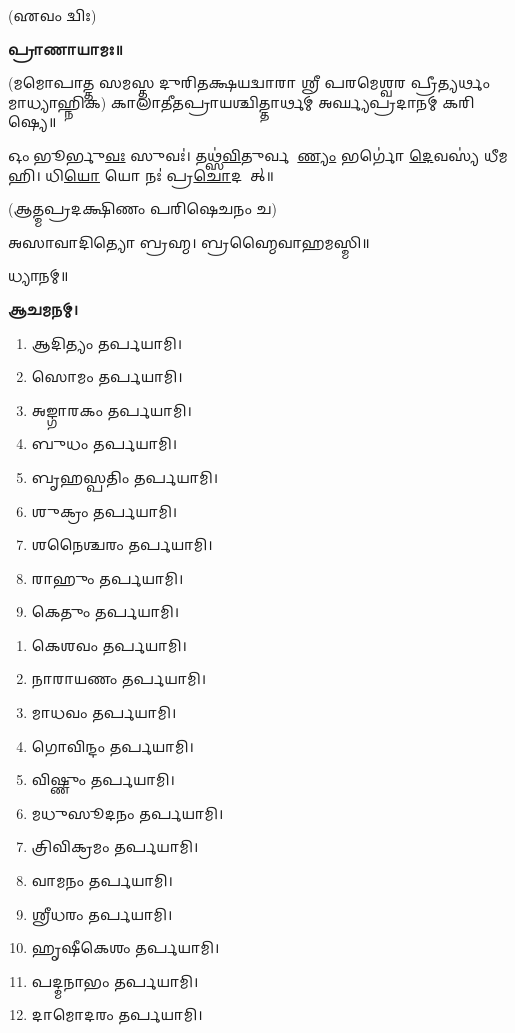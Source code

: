 \hfill{(𑌏𑌵𑌂 𑌦𑍍𑌵𑌿𑌃)}


\textbf{𑌪𑍍𑌰𑌾𑌣𑌾𑌯𑌾𑌮𑌃॥}

(𑌮𑌮𑍋𑌪𑌾𑌤𑍍𑌤 𑌸𑌮𑌸𑍍𑌤 𑌦𑍁𑌰𑌿𑌤𑌕𑍍𑌷𑌯𑌦𑍍𑌵𑌾𑌰𑌾 𑌶𑍍𑌰𑍀 𑌪𑌰𑌮𑍇𑌶𑍍𑌵𑌰 𑌪𑍍𑌰𑍀𑌤𑍍𑌯𑌰𑍍𑌥𑌂 𑌮𑌾𑌧𑍍𑌯𑌾𑌹𑍍𑌨𑌿𑌕)
𑌕𑌾𑌲𑌾𑌤𑍀𑌤𑌪𑍍𑌰𑌾𑌯𑌶𑍍𑌚𑌿𑌤𑍍𑌤𑌾𑌰𑍍𑌥𑌮𑍍 𑌅𑌰𑍍𑌘𑍍𑌯𑌪𑍍𑌰𑌦𑌾𑌨𑌮𑍍 𑌕𑌰𑌿𑌷𑍍𑌯𑍇॥

𑌓𑌂 𑌭𑍂𑌰𑍍𑌭𑍁\ul{𑌵𑌃} 𑌸𑍁𑌵𑌃॑। 𑌤𑌥𑍍𑌸॑\ul{𑌵𑌿}𑌤𑍁𑌰𑍍𑌵𑌰𑍇᳚\ul{𑌣𑍍𑌯𑌂} 𑌭𑌰𑍍𑌗𑍋॑ \ul{𑌦𑍇}𑌵𑌸𑍍𑌯॑ 𑌧𑍀𑌮𑌹𑌿। 𑌧𑌿\ul{𑌯𑍋} 𑌯𑍋 𑌨𑌃॑ 𑌪𑍍𑌰\ul{𑌚𑍋}𑌦𑌯𑌾᳚𑌤𑍍॥

(𑌆𑌤𑍍𑌮𑌪𑍍𑌰𑌦𑌕𑍍𑌷𑌿𑌣𑌂 𑌪𑌰𑌿𑌷𑍇𑌚𑌨𑌂 𑌚)


𑌅𑌸𑌾𑌵𑌾𑌦𑌿𑌤𑍍𑌯𑍋 𑌬𑍍𑌰𑌹𑍍𑌮। 𑌬𑍍𑌰𑌹𑍍𑌮𑍈𑌵𑌾𑌹𑌮𑌸𑍍𑌮𑌿॥

𑌧𑍍𑌯𑌾𑌨𑌮𑍍॥

\textbf{𑌆𑌚𑌮𑌨𑌮𑍍।}



\begin{enumerate}
 \item 𑌆𑌦𑌿𑌤𑍍𑌯𑌂 𑌤𑌰𑍍𑌪𑌯𑌾𑌮𑌿।
 \item 𑌸𑍋𑌮𑌂 𑌤𑌰𑍍𑌪𑌯𑌾𑌮𑌿।
 \item 𑌅𑌙𑍍𑌗𑌾𑌰𑌕𑌂 𑌤𑌰𑍍𑌪𑌯𑌾𑌮𑌿।
 \item 𑌬𑍁𑌧𑌂 𑌤𑌰𑍍𑌪𑌯𑌾𑌮𑌿।
 \item 𑌬𑍃𑌹𑌸𑍍𑌪𑌤𑌿𑌂 𑌤𑌰𑍍𑌪𑌯𑌾𑌮𑌿।
 \item 𑌶𑍁𑌕𑍍𑌰𑌂 𑌤𑌰𑍍𑌪𑌯𑌾𑌮𑌿।
 \item 𑌶𑌨𑍈𑌶𑍍𑌚𑌰𑌂 𑌤𑌰𑍍𑌪𑌯𑌾𑌮𑌿।
 \item 𑌰𑌾𑌹𑍁𑌂 𑌤𑌰𑍍𑌪𑌯𑌾𑌮𑌿।
 \item 𑌕𑍇𑌤𑍁𑌂 𑌤𑌰𑍍𑌪𑌯𑌾𑌮𑌿।
\end{enumerate}


\begin{enumerate}
\item 𑌕𑍇𑌶𑌵𑌂 𑌤𑌰𑍍𑌪𑌯𑌾𑌮𑌿।
\item 𑌨𑌾𑌰𑌾𑌯𑌣𑌂 𑌤𑌰𑍍𑌪𑌯𑌾𑌮𑌿।
\item 𑌮𑌾𑌧𑌵𑌂 𑌤𑌰𑍍𑌪𑌯𑌾𑌮𑌿।
\item 𑌗𑍋𑌵𑌿𑌨𑍍𑌦𑌂 𑌤𑌰𑍍𑌪𑌯𑌾𑌮𑌿।
\item 𑌵𑌿𑌷𑍍𑌣𑍁𑌂 𑌤𑌰𑍍𑌪𑌯𑌾𑌮𑌿।
\item 𑌮𑌧𑍁𑌸𑍂𑌦𑌨𑌂 𑌤𑌰𑍍𑌪𑌯𑌾𑌮𑌿।
\item 𑌤𑍍𑌰𑌿𑌵𑌿𑌕𑍍𑌰𑌮𑌂 𑌤𑌰𑍍𑌪𑌯𑌾𑌮𑌿।
\item 𑌵𑌾𑌮𑌨𑌂 𑌤𑌰𑍍𑌪𑌯𑌾𑌮𑌿।
\item 𑌶𑍍𑌰𑍀𑌧𑌰𑌂 𑌤𑌰𑍍𑌪𑌯𑌾𑌮𑌿।
\item 𑌹𑍃𑌷𑍀𑌕𑍇𑌶𑌂 𑌤𑌰𑍍𑌪𑌯𑌾𑌮𑌿।
\item 𑌪𑌦𑍍𑌮𑌨𑌾𑌭𑌂 𑌤𑌰𑍍𑌪𑌯𑌾𑌮𑌿।
\item 𑌦𑌾𑌮𑍋𑌦𑌰𑌂 𑌤𑌰𑍍𑌪𑌯𑌾𑌮𑌿।
\end{enumerate}

